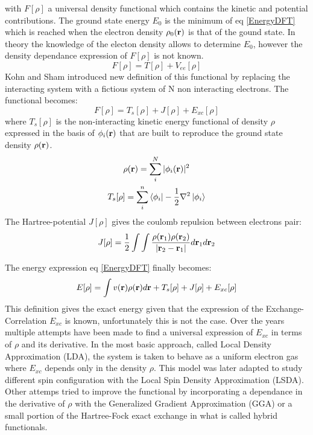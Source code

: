 \documentclass[10pt]{report}
\numberwithin{equation}{section}
\begin{document}
with $F[\rho]$ a universal density functional which contains the kinetic and potential contributions.
The ground state energy $E_0$ is the minimum of eq \ref{EnergyDFT} which is reached when the electron density $\rho_0(\vb r)$ is that of the gound state.
In theory the knowledge of the electon density allows to determine $E_0$, however the density dependance expression of $F[\rho]$ is not known.
\begin{equation}
    F[\rho]=T[\rho]+V_{ee}[\rho]
\end{equation}
Kohn and Sham introduced new definition of this functional by replacing the interacting system with a fictious system of N non interacting electrons.%
The functional becomes:
\begin{equation}
    F[\rho]=T_s[\rho]+J[\rho]+E_{xc}[\rho]
\end{equation}
where $T_s[\rho]$ is the non-interacting kinetic energy functional of density $\rho$ expressed in the basis of $\phi_i (\vb r)$ that are built to reproduce the ground state density $\rho(\vb r)$.
\begin{gather}
    \rho(\vb r) = \sum_{i}^{N} |\phi_i (\vb r)|^2\\
    T_s[\rho]=\sum_{i}^{n} \bra{\phi_i} -\frac{1}{2}\nabla^2 \ket{\phi_i}
\end{gather}
The Hartree-potential $J[\rho]$ gives the coulomb repulsion between electrons pair:
\begin{equation}
    J[\rho]=\frac{1}{2}\int\int \frac{\rho(\vb r_1) \rho(\vb r_2)}{|\vb r_2 - \vb r_1 |} d\vb r_1 d\vb r_2
\end{equation}

The energy expression eq \ref{EnergyDFT} finally becomes:
\begin{equation}
    E[\rho]= \int v(\vb r) \rho(\vb r) d\vb r + T_s[\rho] + J[\rho]+ E_{xc}[\rho]
\end{equation}
This definition gives the exact energy given that the expression of the Exchange-Correlation $E_{xc}$ is known, unfortunately this is not the case. 
Over the years multiple attempts have been made to find a universal expression of $E_{xc}$ in terms of $\rho$ and its derivative. 
In the most basic approach, called Local Density Approximation (LDA), the system is taken to behave as a uniform electron gas where $E_{xc}$ depends only in the density $\rho$. 
This model was later adapted to study different spin configuration with the Local Spin Density Approximation (LSDA).
Other attemps tried to improve the functional by incorporating a dependance in the derivative of $\rho$ with the Generalized Gradient Approximation (GGA) or a small portion of the Hartree-Fock exact exchange in what is called hybrid functionals.
\end{document}
